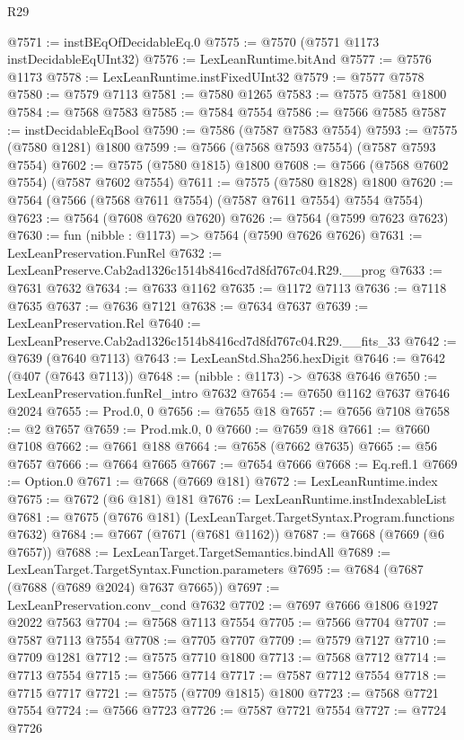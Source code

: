 \begin{lexlean}{R29}
\begin{coremodule}
@7571 := instBEqOfDecidableEq.{0}
@7575 := @7570 (@7571 @1173 instDecidableEqUInt32)
@7576 := LexLeanRuntime.bitAnd
@7577 := @7576 @1173
@7578 := LexLeanRuntime.instFixedUInt32
@7579 := @7577 @7578
@7580 := @7579 @7113
@7581 := @7580 @1265
@7583 := @7575 @7581 @1800
@7584 := @7568 @7583
@7585 := @7584 @7554
@7586 := @7566 @7585
@7587 := instDecidableEqBool
@7590 := @7586 (@7587 @7583 @7554)
@7593 := @7575 (@7580 @1281) @1800
@7599 := @7566 (@7568 @7593 @7554) (@7587 @7593 @7554)
@7602 := @7575 (@7580 @1815) @1800
@7608 := @7566 (@7568 @7602 @7554) (@7587 @7602 @7554)
@7611 := @7575 (@7580 @1828) @1800
@7620 := @7564 (@7566 (@7568 @7611 @7554) (@7587 @7611 @7554) @7554 @7554)
@7623 := @7564 (@7608 @7620 @7620)
@7626 := @7564 (@7599 @7623 @7623)
@7630 := fun (nibble : @1173) => @7564 (@7590 @7626 @7626)
@7631 := LexLeanPreservation.FunRel
@7632 := LexLeanPreserve.Cab2ad1326c1514b8416cd7d8fd767c04.R29.__prog
@7633 := @7631 @7632
@7634 := @7633 @1162
@7635 := @1172 @7113
@7636 := @7118 @7635
@7637 := @7636 @7121
@7638 := @7634 @7637
@7639 := LexLeanPreservation.Rel
@7640 := LexLeanPreserve.Cab2ad1326c1514b8416cd7d8fd767c04.R29.__fits_33
@7642 := @7639 (@7640 @7113)
@7643 := LexLeanStd.Sha256.hexDigit
@7646 := @7642 (@407 (@7643 @7113))
@7648 := (nibble : @1173) -> @7638 @7646
@7650 := LexLeanPreservation.funRel_intro @7632
@7654 := @7650 @1162 @7637 @7646 @2024
@7655 := Prod.{0, 0}
@7656 := @7655 @18
@7657 := @7656 @7108
@7658 := @2 @7657
@7659 := Prod.mk.{0, 0}
@7660 := @7659 @18
@7661 := @7660 @7108
@7662 := @7661 @188
@7664 := @7658 (@7662 @7635)
@7665 := @56 @7657
@7666 := @7664 @7665
@7667 := @7654 @7666
@7668 := Eq.refl.{1}
@7669 := Option.{0}
@7671 := @7668 (@7669 @181)
@7672 := LexLeanRuntime.index
@7675 := @7672 (@6 @181) @181
@7676 := LexLeanRuntime.instIndexableList
@7681 := @7675 (@7676 @181) (LexLeanTarget.TargetSyntax.Program.functions @7632)
@7684 := @7667 (@7671 (@7681 @1162))
@7687 := @7668 (@7669 (@6 @7657))
@7688 := LexLeanTarget.TargetSemantics.bindAll
@7689 := LexLeanTarget.TargetSyntax.Function.parameters
@7695 := @7684 (@7687 (@7688 (@7689 @2024) @7637 @7665))
@7697 := LexLeanPreservation.conv_cond @7632
@7702 := @7697 @7666 @1806 @1927 @2022 @7563
@7704 := @7568 @7113 @7554
@7705 := @7566 @7704
@7707 := @7587 @7113 @7554
@7708 := @7705 @7707
@7709 := @7579 @7127
@7710 := @7709 @1281
@7712 := @7575 @7710 @1800
@7713 := @7568 @7712
@7714 := @7713 @7554
@7715 := @7566 @7714
@7717 := @7587 @7712 @7554
@7718 := @7715 @7717
@7721 := @7575 (@7709 @1815) @1800
@7723 := @7568 @7721 @7554
@7724 := @7566 @7723
@7726 := @7587 @7721 @7554
@7727 := @7724 @7726

\end{coremodule}
\end{lexlean}
